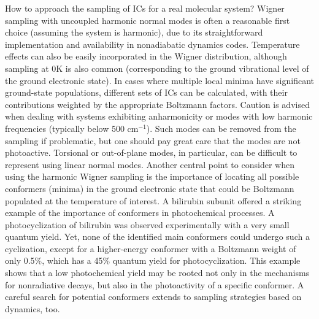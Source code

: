 \documentclass[9pt,bestpractices,pubversion]{livecoms}
\begin{document}
How to approach the sampling of ICs for a real molecular system?  Wigner sampling with uncoupled harmonic normal modes is often a reasonable first choice (assuming the system is harmonic), due to its straightforward implementation and availability in nonadiabatic dynamics codes. Temperature effects can also be easily incorporated in the Wigner distribution, although sampling at 0K is also common (corresponding to the ground vibrational level of the ground electronic state). In cases where multiple local minima have significant ground-state populations, different sets of ICs can be calculated, with their contributions weighted by the appropriate Boltzmann factors.\cite{marsili2022theoretical} Caution is advised when dealing with systems exhibiting anharmonicity or modes with low harmonic frequencies (typically below 500 cm$^{-1}$). Such modes can be removed from the sampling if problematic,\cite{persico2014overview,favero2013dynamics} but one should pay great care that the modes are not photoactive.\cite{prlj2023deciphering} Torsional or out-of-plane modes, in particular, can be difficult to represent using linear normal modes.\cite{mccoy2014role,C8FD90051E} Another central point to consider when using the harmonic Wigner sampling is the importance of locating all possible conformers (minima) in the ground electronic state that could be Boltzmann populated at the temperature of interest. A bilirubin subunit offered a striking example of the importance of conformers in photochemical processes. A photocyclization of bilirubin was observed experimentally with a very small quantum yield. Yet, none of the identified main conformers could undergo such a cyclization, except for a higher-energy conformer with a Boltzmann weight of only 0.5\%, which has a 45\% quantum yield for photocyclization.\cite{janos2020bilirubin} This example shows that a low photochemical yield may be rooted not only in the mechanisms for nonradiative decays, but also in the photoactivity of a specific conformer. A careful search for potential conformers extends to sampling strategies based on dynamics, too. 
\end{document}
